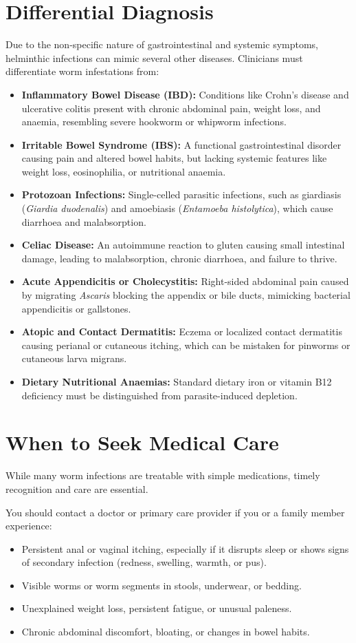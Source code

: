 \section*{Differential Diagnosis}
Due to the non-specific nature of gastrointestinal and systemic symptoms, helminthic infections can mimic several other diseases. Clinicians must differentiate worm infestations from:
\begin{itemize}
    \item \textbf{Inflammatory Bowel Disease (IBD):} Conditions like Crohn's disease and ulcerative colitis present with chronic abdominal pain, weight loss, and anaemia, resembling severe hookworm or whipworm infections.
    \item \textbf{Irritable Bowel Syndrome (IBS):} A functional gastrointestinal disorder causing pain and altered bowel habits, but lacking systemic features like weight loss, eosinophilia, or nutritional anaemia.
    \item \textbf{Protozoan Infections:} Single-celled parasitic infections, such as giardiasis (\textit{Giardia duodenalis}) and amoebiasis (\textit{Entamoeba histolytica}), which cause diarrhoea and malabsorption.
    \item \textbf{Celiac Disease:} An autoimmune reaction to gluten causing small intestinal damage, leading to malabsorption, chronic diarrhoea, and failure to thrive.
    \item \textbf{Acute Appendicitis or Cholecystitis:} Right-sided abdominal pain caused by migrating \textit{Ascaris} blocking the appendix or bile ducts, mimicking bacterial appendicitis or gallstones.
    \item \textbf{Atopic and Contact Dermatitis:} Eczema or localized contact dermatitis causing perianal or cutaneous itching, which can be mistaken for pinworms or cutaneous larva migrans.
    \item \textbf{Dietary Nutritional Anaemias:} Standard dietary iron or vitamin B12 deficiency must be distinguished from parasite-induced depletion.
\end{itemize}

\section*{When to Seek Medical Care}
While many worm infections are treatable with simple medications, timely recognition and care are essential.

You should contact a doctor or primary care provider if you or a family member experience:
\begin{itemize}
    \item Persistent anal or vaginal itching, especially if it disrupts sleep or shows signs of secondary infection (redness, swelling, warmth, or pus).
    \item Visible worms or worm segments in stools, underwear, or bedding.
    \item Unexplained weight loss, persistent fatigue, or unusual paleness.
    \item Chronic abdominal discomfort, bloating, or changes in bowel habits.
\end{itemize}

